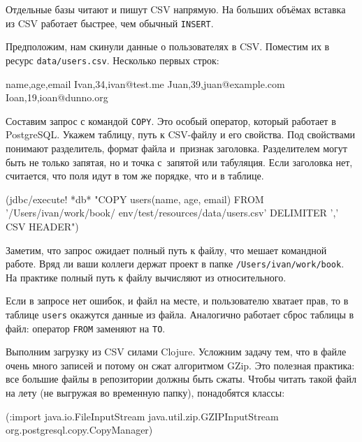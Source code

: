 
Отдельные базы читают и пишут CSV напрямую. На больших объёмах вставка из CSV
работает быстрее, чем обычный \verb|INSERT|.

Предположим, нам скинули данные о пользователях в CSV. Поместим их в ресурс
\verb|data/users.csv|. Несколько первых строк:

\begin{english}
  \begin{text}
name,age,email
Ivan,34,ivan@test.me
Juan,39,juan@example.com
Ioan,19,ioan@dunno.org
  \end{text}
\end{english}


Составим запрос с командой \verb|COPY|. Это особый оператор, который работает в
PostgreSQL. Укажем таблицу, путь к CSV-файлу и его свойства. Под свойствами
понимают разделитель, формат файла и~признак заголовка. Разделителем могут быть
не только запятая, но и точка с~запятой или табуляция. Если заголовка нет,
считается, что поля идут в том же порядке, что и в таблице.

\begin{english}
  \begin{clojure}
(jdbc/execute! *db*
 "COPY users(name, age, email)
  FROM '/Users/ivan/work/book/
        env/test/resources/data/users.csv'
  DELIMITER ',' CSV HEADER")
  \end{clojure}
\end{english}

Заметим, что запрос ожидает полный путь к файлу, что мешает командной
работе. Вряд ли ваши коллеги держат проект в папке
\verb|/Users/ivan/work/book|. На практике полный путь к файлу вычисляют из
относительного.

Если в запросе нет ошибок, и файл на месте, и пользователю хватает прав, то в
таблице \verb|users| окажутся данные из файла. Аналогично работает сброс таблицы
в файл: оператор \verb|FROM| заменяют на \verb|TO|.


Выполним загрузку из CSV силами Clojure. Усложним задачу тем, что в файле очень
много записей и потому он сжат алгоритмом GZip. Это полезная практика: все
большие файлы в репозитории должны быть сжаты. Чтобы читать такой файл на лету
(не выгружая во временную папку), понадобятся классы:

\begin{english}
  \begin{clojure}
(:import java.io.FileInputStream
         java.util.zip.GZIPInputStream
         org.postgresql.copy.CopyManager)
  \end{clojure}
\end{english}

